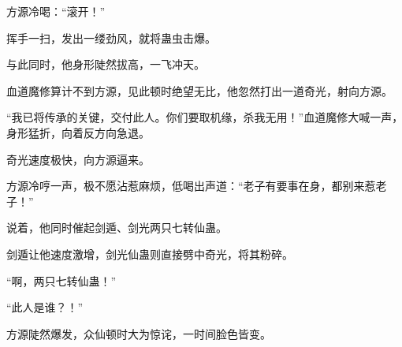 \begin{this_body}
方源冷喝：“滚开！”

挥手一扫，发出一缕劲风，就将蛊虫击爆。

与此同时，他身形陡然拔高，一飞冲天。

血道魔修算计不到方源，见此顿时绝望无比，他忽然打出一道奇光，射向方源。

“我已将传承的关键，交付此人。你们要取机缘，杀我无用！”血道魔修大喊一声，身形猛折，向着反方向急退。

奇光速度极快，向方源逼来。

方源冷哼一声，极不愿沾惹麻烦，低喝出声道：“老子有要事在身，都别来惹老子！”

说着，他同时催起剑遁、剑光两只七转仙蛊。

剑遁让他速度激增，剑光仙蛊则直接劈中奇光，将其粉碎。

“啊，两只七转仙蛊！”

“此人是谁？！”

方源陡然爆发，众仙顿时大为惊诧，一时间脸色皆变。

\end{this_body}

